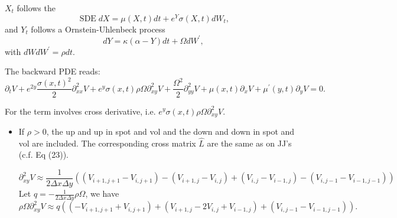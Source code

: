 \documentclass[12pt]{article}
\begin{document}
$X_t$ follows the $$\operatorname{SDE} d X=\mu(X, t) d t+e^Y \sigma(X, t) d W_t,$$ and $Y_t$ follows a Ornstein-Uhlenbeck process $$d Y=\kappa(\alpha-Y) d t+\Omega d W^{\prime},$$ 
with $d W d W^{\prime}=\rho d t$. 

The backward PDE reads:
$$\partial_t V+e^{2 y} \frac{\sigma(x, t)^2}{2} \partial_{x x}^2 V+ e^y \sigma(x, t) \rho \Omega\partial_{x y}^2 V+\frac{\Omega^2}{2} \partial_{y y}^2 V+\mu(x, t) \partial_x V+\mu^{\prime}(y, t) \partial_y V=0.$$

For the term involves cross derivative, i.e. $\boxed{e^y \sigma(x, t) \rho \Omega \partial_{x y}^2 V}$.
\begin{itemize}
    \item If $\rho > 0$, the up and up in spot and vol and the down and down in spot and vol are included. The corresponding cross matrix $\hat L$ are the same as on JJ's (c.f. Eq (23)).
    \begin{center}
    \end{center}    
    \begin{equation}
        \partial^2_{xy}V \approx \frac{1}{2\Delta x\Delta y} \left( \left(V_{i+1,j+1} - V_{i,j+1}\right)  - \left(V_{i+1,j}-V_{i,j}\right) + \left(V_{i,j}-V_{i-1,j}\right)  -  \left(V_{i, j-1}-V_{i-1,j-1}\right) \right)        
    \end{equation}
    Let $q =-\frac{1}{2\Delta x\Delta y}\rho\Omega$, we have
    \begin{equation}
        \rho\Omega\partial^2_{xy}V \approx q\left(\left(-V_{i+1, j+1}+ V_{i,j+1} \right) + \left(V_{i+1,j} - 2V_{i,j} + V_{i-1,j}\right) + \left(V_{i,j-1} - V_{i-1,j-1}\right) \right).     
    \end{equation}
    

\end{itemize}
\end{document}
